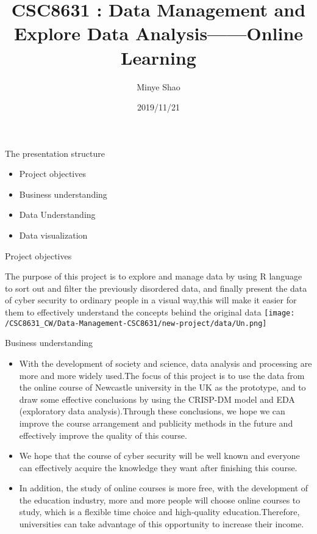 \documentclass[
  ignorenonframetext,
]{beamer}
\title{CSC8631 : Data Management and Explore Data Analysis------Online Learning}
\author{Minye Shao}
\date{2019/11/21}
\providecommand{\tightlist}{%
  \setlength{\itemsep}{0pt}\setlength{\parskip}{0pt}}
\begin{document}
\frame{\titlepage}

\begin{frame}{The presentation structure}
\protect\hypertarget{the-presentation-structure}{}

\begin{itemize}
\tightlist
\item
  Project objectives
\item
  Business understanding
\item
  Data Understanding
\item
  Data visualization
\end{itemize}

\end{frame}

\begin{frame}{Project objectives}
\protect\hypertarget{project-objectives}{}

The purpose of this project is to explore and manage data by using R
language to sort out and filter the previously disordered data, and
finally present the data of cyber security to ordinary people in a
visual way,this will make it easier for them to effectively understand
the concepts behind the original data
\texttt{[image: /CSC8631\_CW/Data-Management-CSC8631/new-project/data/Un.png]}

\end{frame}

\begin{frame}{Business understanding}
\protect\hypertarget{business-understanding}{}

\begin{itemize}
\tightlist
\item
  With the development of society and science, data analysis and
  processing are more and more widely used.The focus of this project is
  to use the data from the online course of Newcastle university in the
  UK as the prototype, and to draw some effective conclusions by using
  the CRISP-DM model and EDA (exploratory data analysis).Through these
  conclusions, we hope we can improve the course arrangement and
  publicity methods in the future and effectively improve the quality of
  this course.
\item
  We hope that the course of cyber security will be well known and
  everyone can effectively acquire the knowledge they want after
  finishing this course.
\item
  In addition, the study of online courses is more free, with the
  development of the education industry, more and more people will
  choose online courses to study, which is a flexible time choice and
  high-quality education.Therefore, universities can take advantage of
  this opportunity to increase their income.
\end{itemize}

\end{frame}
\end{document}
